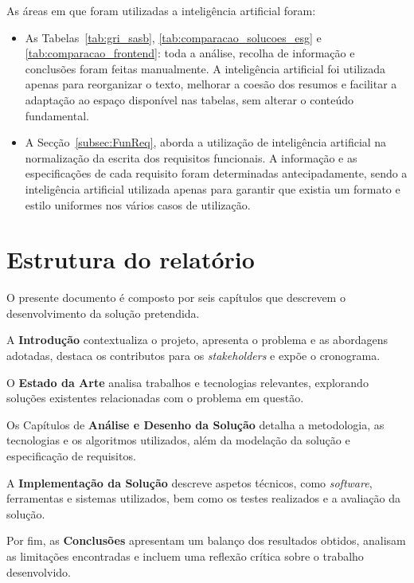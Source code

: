 As áreas em que foram utilizadas a inteligência artificial foram:

\begin{itemize}
  \item As Tabelas~\ref{tab:gri_sasb}, \ref{tab:comparacao_solucoes_esg} e \ref{tab:comparacao_frontend}: toda a análise, recolha de informação e conclusões foram feitas manualmente. A inteligência artificial foi utilizada apenas para reorganizar o texto, melhorar a coesão dos resumos e facilitar a adaptação ao espaço disponível nas tabelas, sem alterar o conteúdo fundamental.

  \item A Secção~\ref{subsec:FunReq}, aborda a utilização de inteligência artificial na normalização da escrita dos requisitos funcionais. A informação e as especificações de cada requisito foram determinadas antecipadamente, sendo a inteligência artificial utilizada apenas para garantir que existia um formato e estilo uniformes nos vários casos de utilização.
\end{itemize}


\section{Estrutura do relatório}

O presente documento é composto por seis capítulos que descrevem o desenvolvimento da solução pretendida.

A \textbf{Introdução} contextualiza o projeto, apresenta o problema e as abordagens adotadas, destaca os contributos para os \textit{stakeholders} e expõe o cronograma.

O \textbf{Estado da Arte} analisa trabalhos e tecnologias relevantes, explorando soluções existentes relacionadas com o problema em questão.

Os Capítulos de \textbf{Análise e Desenho da Solução} detalha a metodologia, as tecnologias e os algoritmos utilizados, além da modelação da solução e especificação de requisitos.

A \textbf{Implementação da Solução} descreve aspetos técnicos, como \textit{software}, ferramentas e sistemas utilizados, bem como os testes realizados e a avaliação da solução.

Por fim, as \textbf{Conclusões} apresentam um balanço dos resultados obtidos, analisam as limitações encontradas e incluem uma reflexão crítica sobre o trabalho desenvolvido.

\vspace{20mm} 
